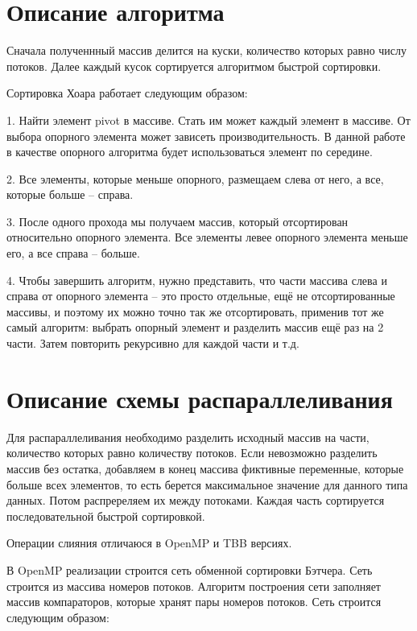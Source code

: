 \documentclass{report}
\begin{document}
\section*{Описание алгоритма}
Сначала полученнный массив делится на куски, количество которых равно числу потоков. Далее каждый кусок сортируется алгоритмом быстрой сортировки.
\par
Сортировка Хоара работает следующим образом:
\par 1. Найти элемент pivot в массиве. Стать им может каждый элемент в массиве. От выбора опорного элемента может зависеть производительность. В данной работе в качестве опорного алгоритма будет использоваться элемент по середине.
\par
2. Все элементы, которые меньше опорного, размещаем слева от него, а все, которые больше – справа.
\par
3. После одного прохода мы получаем массив, который отсортирован относительно опорного элемента. Все элементы левее опорного элемента меньше его, а все справа – больше.
\par
4. Чтобы завершить алгоритм, нужно представить, что части массива слева и справа от опорного элемента – это просто отдельные, ещё не отсортированные массивы, и поэтому их можно точно так же отсортировать, применив тот же самый алгоритм: выбрать опорный элемент и разделить массив ещё раз на 2 части. Затем повторить рекурсивно для каждой части и т.д.
\newpage

\section*{Описание схемы распараллеливания}
Для распараллеливания необходимо разделить исходный массив на части, количество которых равно количеству потоков. Если невозможно разделить массив без остатка, добавляем в конец массива фиктивные переменные, которые больше всех элементов, то есть берется максимальное значение для данного типа данных. Потом распререляем их между потоками.
Каждая часть сортируется последовательной быстрой сортировкой.
\par Операции слияния отличаюся в OpenMP и TBB версиях.
\par В OpenMP реализации строится сеть обменной сортировки Бэтчера. Сеть строится из массива номеров потоков. Алгоритм построения сети заполняет массив компараторов, которые хранят пары номеров потоков. Сеть строится следующим образом:
\end{document}
